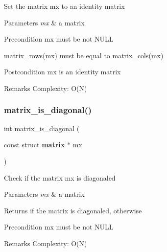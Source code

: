 Set the matrix {\ttfamily mx} to an identity matrix


\begin{DoxyParams}{Parameters}
{\em mx} & a matrix\\
\hline
\end{DoxyParams}
\begin{DoxyPrecond}{Precondition}
{\ttfamily mx} must be not N\+U\+LL 

{\ttfamily matrix\+\_\+rows(mx)} must be equal to {\ttfamily matrix\+\_\+cols(mx)}
\end{DoxyPrecond}
\begin{DoxyPostcond}{Postcondition}
{\ttfamily mx} is an identity matrix
\end{DoxyPostcond}
\begin{DoxyRemark}{Remarks}
Complexity\+: O(\+N) 
\end{DoxyRemark}
\mbox{\label{matrix_8h_a2379a87492cbb3bf0c4fdc8e58589d1c}} 
\subsubsection{matrix\+\_\+is\+\_\+diagonal()}
{\footnotesize\ttfamily int matrix\+\_\+is\+\_\+diagonal (\begin{DoxyParamCaption}\item[{const struct \textbf{ matrix} $\ast$}]{mx }\end{DoxyParamCaption})\hspace{0.3cm}{\ttfamily [inline]}}

Check if the matrix {\ttfamily mx} is diagonaled


\begin{DoxyParams}{Parameters}
{\em mx} & a matrix \\
\hline
\end{DoxyParams}
\begin{DoxyReturn}{Returns}
{} if the matrix is diagonaled, {} otherwise
\end{DoxyReturn}
\begin{DoxyPrecond}{Precondition}
{\ttfamily mx} must be not N\+U\+LL
\end{DoxyPrecond}
\begin{DoxyRemark}{Remarks}
Complexity\+: O(\+N) 
\end{DoxyRemark}
\mbox{\label{matrix_8h_a0bc537e836547fd549f64464c938b1d2}} 
